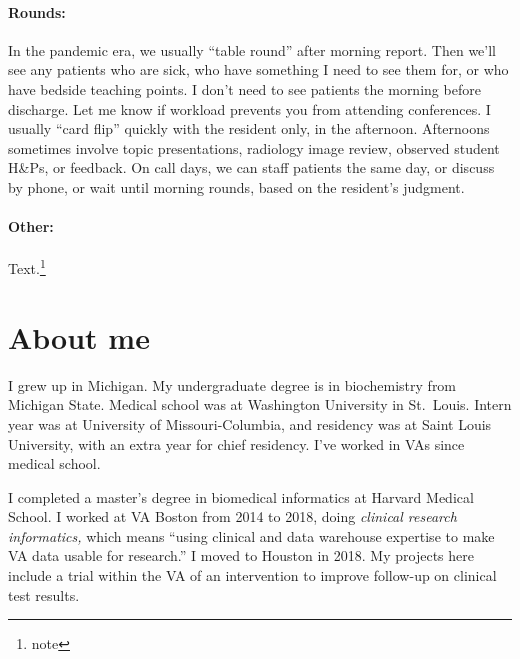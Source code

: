 \documentclass{tufte-handout}
\begin{document}
\paragraph{Rounds:} In the pandemic era, we usually ``table
round'' after morning report. Then we'll see any patients who are
sick, who have something I need to see them for, or who have bedside
teaching points. I don't need to see patients the morning before
discharge. Let me know if workload prevents you from attending
conferences. I usually ``card flip'' quickly with the resident only,
in the afternoon. Afternoons sometimes involve topic presentations,
radiology image review, observed student H\&Ps, or feedback. On call
days, we can staff patients the same day, or discuss by phone, or wait
until morning rounds, based on the resident's judgment.

\paragraph{Other:} Text.\footnote{note}

\section{About me}

I grew up in Michigan. My undergraduate degree is in biochemistry from
Michigan State. Medical school was at Washington University in
St.\ Louis. Intern year was at University of Missouri-Columbia, and
residency was at Saint Louis University, with an extra year for chief
residency. I've worked in VAs since medical school.


I completed a master's degree in biomedical informatics at Harvard
Medical School. I worked at VA Boston from 2014 to 2018, doing
\emph{clinical research informatics,} which means ``using clinical and
data warehouse expertise to make VA data usable for
research.'' I moved to Houston in 2018. My projects here
include a trial within the VA of an intervention to improve follow-up
on clinical test results.
\end{document}
